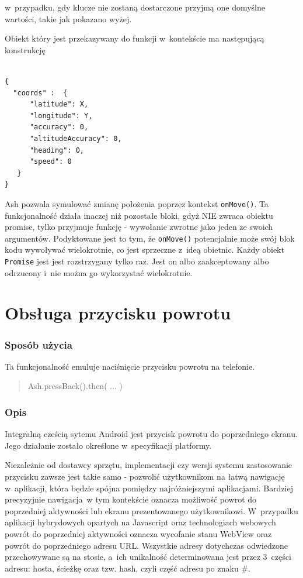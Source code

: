 \documentclass[brudnopis]{xmgr}
\begin{document}
w~przypadku, gdy klucze nie zostaną dostarczone przyjmą one domyślne wartości, takie jak pokazano wyżej. 

Obiekt który jest przekazywany do funkcji w~kontekście ma następującą konstrukcję 

\begin{lstlisting}

{
  "coords" :  {
      "latitude": X, 
      "longitude": Y,
      "accuracy": 0, 
      "altitudeAccuracy": 0, 
      "heading": 0, 
      "speed": 0
   }
}

\end{lstlisting}
Ash pozwala symulować zmianę położenia poprzez kontekst \texttt{onMove()}. Ta funkcjonalność działa inaczej niż pozostałe bloki, gdyż NIE zwraca obiektu promise, tylko przyjmuje funkcję - wywołanie zwrotne jako jeden ze swoich argumentów. Podyktowane jest to tym, że \texttt{onMove()} potencjalnie może swój blok kodu wywoływać wielokrotnie, co jest sprzeczne z~ideą obietnic. Każdy obiekt \texttt{Promise} jest jest rozstrzygany tylko raz. Jest on albo zaakceptowany albo odrzucony i~nie można go wykorzystać wielokrotnie. 

\section{Obsługa przycisku powrotu}

\subsubsection{Sposób użycia}
Ta funkcjonalność emuluje naciśnięcie przycisku powrotu na telefonie. 

\begin{quote}
Ash.pressBack().then( ... ) 
\end{quote}

\subsubsection{Opis}

Integralną cześcią sytemu Android jest przycisk powrotu do poprzedniego ekranu. Jego działanie zostało określone w~specyfikacji platformy.

Niezależnie od dostawcy sprzętu, implementacji czy wersji systemu zastosowanie przycisku zawsze jest takie samo - pozwolić użytkownikom na łatwą nawigację w~aplikacji, która będzie spójna pomiędzy najróżniejszymi aplikacjami. Bardziej precyzyjnie nawigacja~w tym kontekście  oznacza możliwość powrot do poprzedniej aktywności lub ekranu prezentowanego użytkownikowi. W~przypadku aplikacji hybrydowych opartych na Javascript oraz technologiach webowych powrót do poprzedniej aktywności oznacza wycofanie stanu WebView oraz powrót do poprzedniego adresu URL. Wszystkie adresy dotychczas odwiedzone przechowywane są na stosie, a~ich unikalność determinowana jest przez 3~części adresu: hosta, ścieżkę oraz tzw. hash, czyli część adresu po znaku \#. 
\end{document}
